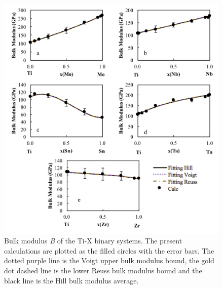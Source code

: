 \pagebreak
\begin{figure}[H]
	\centering
	\includegraphics[width=\textwidth]{Chapter-5/Figures/tixbulk.png}
	\caption{Bulk modulus \textit{B} of the Ti-X binary systems. The present calculations are plotted as the filled circles with the error bars. The dotted purple line is the Voigt upper bulk modulus bound, the gold dot dashed line is the lower Reuss bulk modulus bound and the black line is the Hill bulk modulus average.}
	\label{Ch5-figure:tixbulk}
\end{figure}

